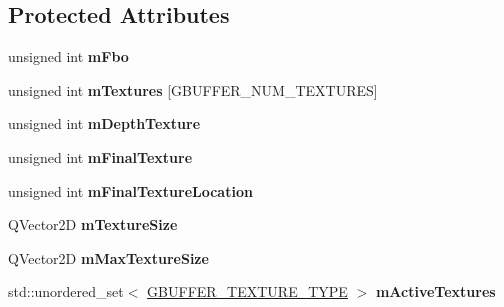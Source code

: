 \subsection*{Protected Attributes}
\begin{DoxyCompactItemize}
\item 
\mbox{\label{class_geometry_engine_1_1_geometry_buffer_1_1_g_buffer_afa5700526d827e83d0b6915c40cdbde8}} 
unsigned int {\bfseries m\+Fbo}
\item 
\mbox{\label{class_geometry_engine_1_1_geometry_buffer_1_1_g_buffer_a485e15e91bc847fcf66d79be6dfbdc99}} 
unsigned int {\bfseries m\+Textures} \mbox{[}G\+B\+U\+F\+F\+E\+R\+\_\+\+N\+U\+M\+\_\+\+T\+E\+X\+T\+U\+R\+ES\mbox{]}
\item 
\mbox{\label{class_geometry_engine_1_1_geometry_buffer_1_1_g_buffer_a7923c84d57522ea62a748db16ceafff6}} 
unsigned int {\bfseries m\+Depth\+Texture}
\item 
\mbox{\label{class_geometry_engine_1_1_geometry_buffer_1_1_g_buffer_ad5d3493f8b8c0e2044b1cfc0484c3c3c}} 
unsigned int {\bfseries m\+Final\+Texture}
\item 
\mbox{\label{class_geometry_engine_1_1_geometry_buffer_1_1_g_buffer_a6fc8627c8538eb232c21f0f23e0375d1}} 
unsigned int {\bfseries m\+Final\+Texture\+Location}
\item 
\mbox{\label{class_geometry_engine_1_1_geometry_buffer_1_1_g_buffer_a14ab02ce110b16e44ade0d2cec0a1bfe}} 
Q\+Vector2D {\bfseries m\+Texture\+Size}
\item 
\mbox{\label{class_geometry_engine_1_1_geometry_buffer_1_1_g_buffer_a5dab69ea8f4510c241ccda6817b4af32}} 
Q\+Vector2D {\bfseries m\+Max\+Texture\+Size}
\item 
\mbox{\label{class_geometry_engine_1_1_geometry_buffer_1_1_g_buffer_ad9b17162f29ea4d0600d665bd3f7f0e3}} 
std\+::unordered\+\_\+set$<$ \mbox{\hyperlink{class_geometry_engine_1_1_geometry_buffer_1_1_g_buffer_a718dceafcac1915f7de061108597e1cc}{G\+B\+U\+F\+F\+E\+R\+\_\+\+T\+E\+X\+T\+U\+R\+E\+\_\+\+T\+Y\+PE}} $>$ {\bfseries m\+Active\+Textures}
\end{DoxyCompactItemize}


